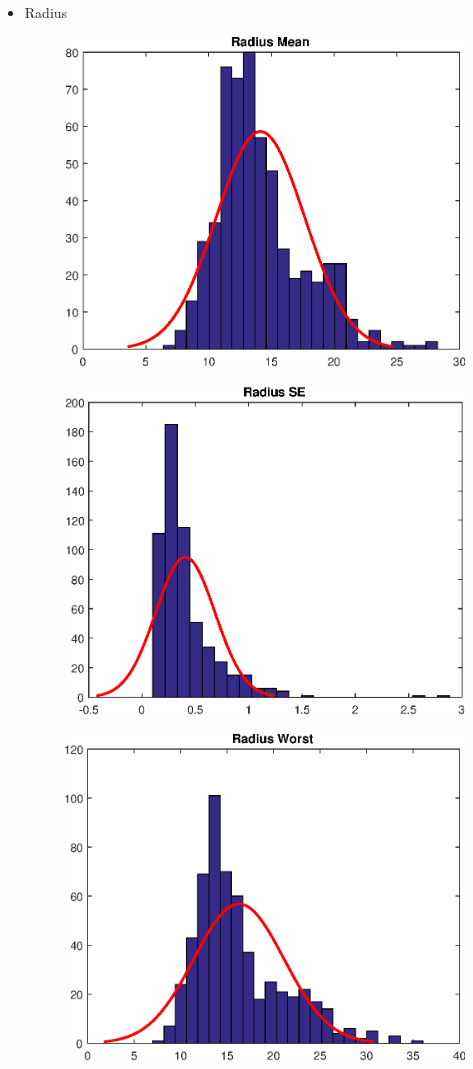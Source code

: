 \documentclass[11pt,a4paper]{article}
\numberwithin{equation}{section}
\begin{document}
\begin{itemize}
\item Radius
\begin{figure}[H]
\centering
  \includegraphics[width=.4\linewidth]{./img/radius_mean}
  \label{fig:test1}
\end{figure}%

\begin{figure}[H]
\centering
\begin{minipage}{.4\textwidth}
  \centering
  \includegraphics[width=\linewidth]{./img/radius_se}
  \label{fig:test1}
\end{minipage}%
\begin{minipage}{.4\textwidth}
  \centering
  \includegraphics[width=\linewidth]{./img/radius_worst}

\end{minipage}
\end{figure}
\end{itemize}
\end{document}

